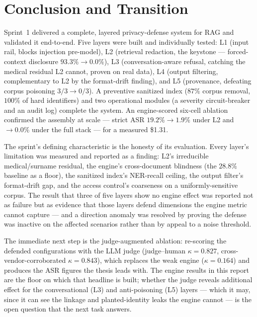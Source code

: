 \documentclass[11pt,a4paper]{article}
\newcommand{\kp}{\ensuremath{\kappa}}
\begin{document}
\section{Conclusion and Transition}

Sprint~1 delivered a complete, layered privacy-defense system for RAG and validated it end-to-end. Five layers were built and individually tested: L1 (input rail, blocks injection pre-model), L2 (retrieval redaction, the keystone --- forced-context disclosure $93.3\% \to 0.0\%$), L3 (conversation-aware refusal, catching the medical residual L2 cannot, proven on real data), L4 (output filtering, complementary to L2 by the format-drift finding), and L5 (provenance, defeating corpus poisoning $3/3 \to 0/3$). A preventive sanitized index ($87\%$ corpus removal, $100\%$ of hard identifiers) and two operational modules (a severity circuit-breaker and an audit log) complete the system. An engine-scored six-cell ablation confirmed the assembly at scale --- strict ASR $19.2\% \to 1.9\%$ under L2 and $\to 0.0\%$ under the full stack --- for a measured \$1.31.

The sprint's defining characteristic is the honesty of its evaluation. Every layer's limitation was measured and reported as a finding: L2's irreducible medical/surname residual, the engine's cross-document blindness (the $28.8\%$ baseline as a floor), the sanitized index's NER-recall ceiling, the output filter's format-drift gap, and the access control's coarseness on a uniformly-sensitive corpus. The result that three of five layers show no engine effect was reported not as failure but as evidence that those layers defend dimensions the engine metric cannot capture --- and a direction anomaly was resolved by proving the defense was inactive on the affected scenarios rather than by appeal to a noise threshold.

The immediate next step is the judge-augmented ablation: re-scoring the defended configurations with the LLM judge (judge--human $\kp = 0.827$, cross-vendor-corroborated $\kp = 0.843$), which replaces the weak engine ($\kp = 0.164$) and produces the ASR figures the thesis leads with. The engine results in this report are the floor on which that headline is built; whether the judge reveals additional effect for the conversational (L3) and anti-poisoning (L5) layers --- which it may, since it can see the linkage and planted-identity leaks the engine cannot --- is the open question that the next task answers.
\end{document}
